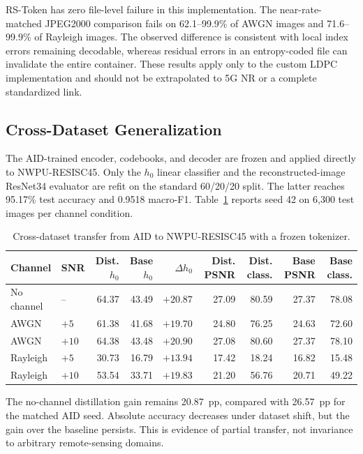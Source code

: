 \documentclass[letterpaper,journal]{IEEEtran}
\newcommand{\pp}{~pp\xspace}
\begin{document}
RS-Token has zero file-level failure in this implementation. The near-rate-matched JPEG2000 comparison fails on 62.1--99.9\% of AWGN images and 71.6--99.9\% of Rayleigh images. The observed difference is consistent with local index errors remaining decodable, whereas residual errors in an entropy-coded file can invalidate the entire container. These results apply only to the custom LDPC implementation and should not be extrapolated to 5G NR or a complete standardized link.

\subsection{Cross-Dataset Generalization}
\label{sec:generalization}
The AID-trained encoder, codebooks, and decoder are frozen and applied directly to NWPU-RESISC45. Only the $h_0$ linear classifier and the reconstructed-image ResNet34 evaluator are refit on the standard 60/20/20 split. The latter reaches 95.17\% test accuracy and 0.9518 macro-F1. Table~\ref{tab:nwpu} reports seed 42 on 6,300 test images per channel condition.

\begin{table}[!t]
\centering
\caption{Cross-dataset transfer from AID to NWPU-RESISC45 with a frozen tokenizer.}
\label{tab:nwpu}
\scriptsize
\setlength{\tabcolsep}{2.7pt}
\begin{tabular}{@{}llrrrrrrr@{}}
\toprule
Channel & SNR & Dist. $h_0$ & Base $h_0$ & $\Delta h_0$ & Dist. PSNR & Dist. class. & Base PSNR & Base class. \\ \midrule
No channel & -- & 64.37 & 43.49 & $+20.87$ & 27.09 & 80.59 & 27.37 & 78.08 \\
AWGN & $+5$ & 61.38 & 41.68 & $+19.70$ & 24.80 & 76.25 & 24.63 & 72.60 \\
AWGN & $+10$ & 64.38 & 43.48 & $+20.90$ & 27.08 & 80.60 & 27.37 & 78.10 \\
Rayleigh & $+5$ & 30.73 & 16.79 & $+13.94$ & 17.42 & 18.24 & 16.82 & 15.48 \\
Rayleigh & $+10$ & 53.54 & 33.71 & $+19.83$ & 21.20 & 56.76 & 20.71 & 49.22 \\ \bottomrule
\end{tabular}
\end{table}

The no-channel distillation gain remains 20.87\pp, compared with 26.57\pp for the matched AID seed. Absolute accuracy decreases under dataset shift, but the gain over the baseline persists. This is evidence of partial transfer, not invariance to arbitrary remote-sensing domains.
\end{document}
